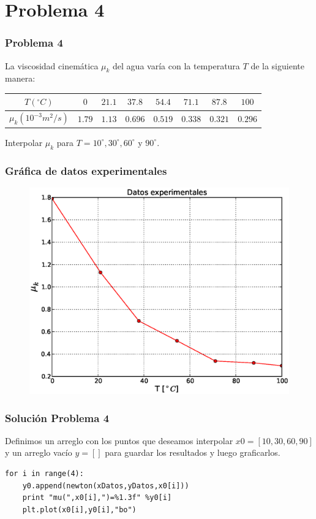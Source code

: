\section{Problema 4}
\begin{frame}
\frametitle{Problema 4}
La viscosidad cinem\'{a}tica $\mu_{k}$ del agua var\'{i}a con la temperatura $T$ de la siguiente manera:
	\begin{table}[H]
		\centering
		\fontsize{10}{10}\selectfont
				\begin{tabulary}{15cm}{c | c | c | c | c | c | c | c }
					$T(^\circ C)$ & $0$ & $21.1$ & $37.8$ & $54.4$ & $71.1$ & $87.8$ & $100$ \\
					\midrule
					$\mu_{k} (10^{-3}m^{2}/s)$ & $1.79$ & $1.13$ & $0.696$ & $0.519$ & $0.338$ & $0.321$ & $0.296$ 
				\end{tabulary}
	\end{table}
	Interpolar $\mu_{k}$ para $T= 10^{\circ},30^{\circ},60^{\circ}$ y $90^{\circ}$.
\end{frame}
\begin{frame}
\frametitle{Gr\'{a}fica de datos experimentales}
\begin{figure}
	\centering
	\includegraphics[scale=0.45]{Imagenes/Tarea_Raices_Problema_4_01.eps}
\end{figure}
\end{frame}
\begin{frame}[fragile]
\frametitle{Soluci\'{o}n Problema 4}
Definimos un arreglo con los puntos que deseamos interpolar $x0=[10,30,60,90]$ y un arreglo vac\'{i}o $y=[]$ para guardar los resultados y luego graficarlos.
\\
\bigskip
\begin{verbatim}
for i in range(4):
    y0.append(newton(xDatos,yDatos,x0[i]))
    print "mu(",x0[i],")=%1.3f" %y0[i]
    plt.plot(x0[i],y0[i],"bo")
\end{verbatim}
\end{frame}
